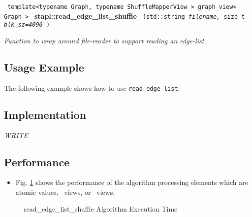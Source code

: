 \noindent
\texttt{%
template<typename Graph, typename ShuffleMapperView >
\newline
graph\_view< Graph >
}
\newline
\textbf{stapl::read\_edge\_list\_shuffle}%
\newline
\texttt{%
(std::string 
\textit{filename,}%
size\_t 
\textit{blk\_sz=4096}%
)
}
\vspace{0.4cm}

\textit{
Function to wrap around file-reader to support reading an edge-list.
}
\vspace{0.4cm}

\subsection{Usage Example} \label{sec-rd-edge-list-alg-use}

The following example shows how to use 
\texttt{read\_edge\_list}:


\subsection{Implementation} \label{sec-rd-edge-list-alg-impl}

\textit{WRITE}

\subsection{Performance} \label{sec-rd-edge-list-alg-perf}

\begin{itemize}
\item
Fig. \ref{fig:rd-edge-list-alg-exec-exper}
shows the performance of the algorithm processing
elements which are atomic values, \stl\ views, or \stapl\ views.
\end{itemize}

\begin{figure}[p]
\caption{ read\_edge\_list\_shuffle Algorithm Execution Time}
\label{fig:rd-edge-list-alg-exec-exper}
\end{figure}


